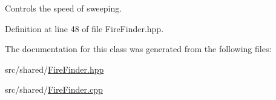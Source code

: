 Controls the speed of sweeping. 



Definition at line 48 of file Fire\-Finder.\-hpp.



The documentation for this class was generated from the following files\-:\begin{DoxyCompactItemize}
\item 
src/shared/\hyperlink{FireFinder_8hpp}{Fire\-Finder.\-hpp}\item 
src/shared/\hyperlink{FireFinder_8cpp}{Fire\-Finder.\-cpp}\end{DoxyCompactItemize}
